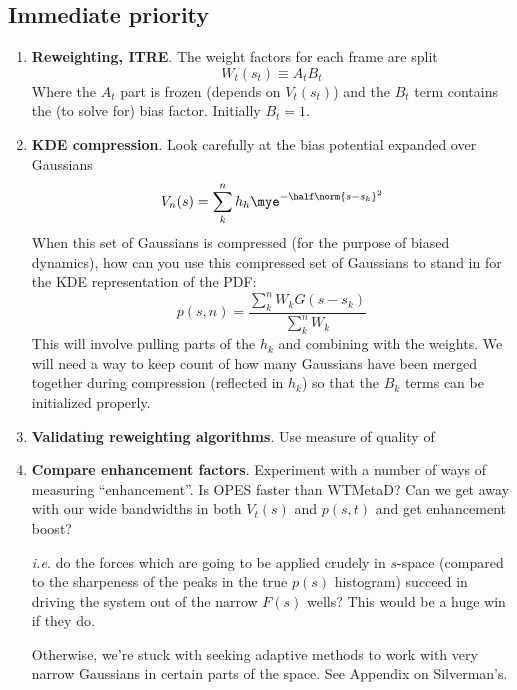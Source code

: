 \subsection{Immediate priority}
\begin{enumerate}
    \item \textbf{Reweighting, ITRE}.  The weight factors for each frame are split
    \[
        W_t(s_t) \equiv A_t B_t
    \]
    Where the $A_t$ part is frozen (depends on $V_t(s_t)$) and the $B_t$ term contains the (to solve for) bias factor.  Initially $B_t = 1$.
    \item \textbf{KDE compression}.  Look carefully at the bias potential expanded over Gaussians
    \[
        V_n(s) = \sum_k^n h_h\mye^{-\half\norm{s-s_k}^2}
    \]
    When this set of Gaussians is compressed (for the purpose of biased dynamics), how can you use this compressed set of Gaussians to stand in for the KDE representation of the PDF:
    \[
        p(s,n) = \frac{\sum_k^n W_k G(s-s_k)}{\sum_k^n W_k}
    \]
    This will involve pulling parts of the $h_k$ and combining with the weights.  We will need a way to keep count of how many Gaussians have been merged together during compression (reflected in $h_k$) so that the $B_k$ terms can be initialized properly.
    \item \textbf{Validating reweighting algorithms}.  Use measure of quality of
    \item \textbf{Compare enhancement factors}.  Experiment with a number of ways of measuring ``enhancement''.  Is OPES faster than WTMetaD?  Can we get away with our wide bandwidths in both $V_t(s)$ and $p(s, t)$ and get enhancement boost?

    \emph{i.e.} do the forces which are going to be applied crudely in $s$-space (compared to the sharpeness of the peaks in the true $p(s)$ histogram) succeed in driving the system out of the narrow $F(s)$ wells?  This would be a huge win if they do.

    Otherwise, we're stuck with seeking adaptive methods to work with very narrow Gaussians in certain parts of the space.  See Appendix on Silverman's.
\end{enumerate}
